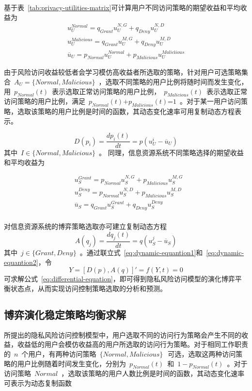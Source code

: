 基于表~\ref{tab:privacy-utilities-matrix}可计算用户不同访问策略的期望收益和平均收益为
\begin{eqnarray}\label{eq:utilities-users}
u_{U}^{Normal}={{q}_{Grant}}u_{U}^{N,G}+{{q}_{Deny}}u_{U}^{N,D} \\ 
 u_{U}^{Malicious}={{q}_{Grant}}u_{U}^{M,G}+{{q}_{Deny}}u_{U}^{M,D} \\ 
{{\overline{u}}_{U}}={{p}_{Normal}}u_{U}^{Normal}+{{p}_{Malicious}}u_{U}^{Malic\text{i}ious}
\end{eqnarray}


由于风险访问收益较低者会学习模仿高收益者所选取的策略，针对用户可选策略集合~${{A}_{U}}=\{Normal,Malicious\}$~，选取不同策略的用户比例将随时间而发生变化，用~${{p}_{Normal}}(t)$~表示选取正常访问策略的用户比例，~${{p}_{Malicious}}(t)$~表示选取正常访问策略的用户比例，满足~${{p}_{Normal}}(t)\text{+}{{p}_{Malicious}}(t)\text{=}1$~。对于某一用户访问策略，选取该策略的用户比例是时间的函数，其动态变化速率可用复制动态方程表示。

\begin{equation}\label{eq:dynamic-equantion1}
D({{p}_{i}})=\frac{d{{p}_{i}}(t)}{dt}=p(u_{U}^{i}-{{\overline{u}}_{U}})
\end{equation}
其中~$I\in \{Normal,Malicious\}$~。
同理，信息资源系统不同策略选择的期望收益和平均收益为

\begin{align}
& u_{S}^{Grant}={{p}_{Normal}}u_{S}^{N,G}+{{p}_{Malicious}}u_{S}^{M,G} \\ 
& u_{S}^{Deny}={{p}_{Normal}}u_{S}^{N,D}+{{p}_{Malicious}}u_{S}^{M,D} \\ 
& {{\overline{u}}_{S}}={{q}_{Grant}}u_{S}^{Grant}+{{q}_{Deny}}u_{S}^{Deny} \\ 
\end{align}

对信息资源系统的博弈策略选取亦可建立复制动态方程
\begin{equation}\label{eq:dynamic-equantion2}
A({{q}_{j}})=\frac{d{{q}_{j}}(t)}{dt}=q(u_{S}^{j}-{{\overline{u}}_{S}})
\end{equation}
其中~$j\in \{Grant,Deny\}$~。通过联立式~\ref{eq:dynamic-equantion1}和~\ref{eq:dynamic-equantion2}，令
\begin{equation}\label{eq:differential-equation}
Y=[ D(p), A(q)]'=f(Y,t)=0
\end{equation}
可求解公式~\ref{eq:differential-equation}，即可得到隐私风险访问模型的演化博弈平衡状态点，从而实现访问控制策略选取的分析和预测。

\subsection{博弈演化稳定策略均衡求解}
\label{subsec:solution}
所提出的隐私风险访问控制模型中，用户选取不同的访问行为策略会产生不同的收益，收益低的用户会模仿收益高的用户所选取的访问行为策略。对于相同工作职责的~$n$~个用户，有两种访问策略~$\{Normal, Malicious\} ~$~可选，选取这两种访问策略的用户比例随着时间发生变化，分别为~$p_{Normal}(t)$~和~$1-p_{Normal}(t)$~。对于访问策略~$Normal$~，选取该策略的用户人数比例是时间的函数，其动态变化速率可表示为动态复制函数

